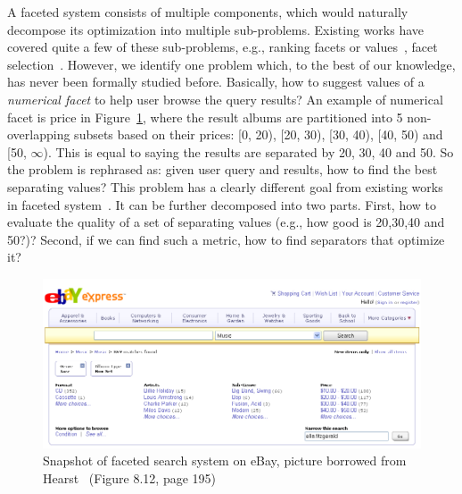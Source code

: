 A faceted system consists of multiple components, which would naturally decompose its optimization into multiple sub-problems. Existing works have covered quite a few of these sub-problems, e.g., ranking facets or values~\cite{Zwol,journals/ijon/KangYZTHC15,kashyap10}, facet selection~\cite{Liberman:2012:AOF:2245276.2245409,Roy08}. However, we identify one problem which, to the best of our knowledge, has never been formally studied before. Basically, how to suggest values of a \emph{numerical facet} to help user browse the query results? An example of numerical facet is price in Figure~\ref{fig:intro_example}, where the result albums are partitioned into 5 non-overlapping subsets based on their prices: [0, 20), [20, 30), [30, 40), [40, 50) and [50, $\infty$). This is equal to saying the results are separated by 20, 30, 40 and 50. So the problem is rephrased as: given user query and results, how to find the best separating values? This problem has a clearly different goal from existing works in faceted system~\cite{Roy08,Liberman:2012:AOF:2245276.2245409,kashyap10,Koren:2008:PIF:1367497.1367562,Hearst2008UI,Vandic:2013:FSA:2505515.2505664}. It can be further decomposed into two parts. First, how to evaluate the quality of a set of separating values (e.g., how good is 20,30,40 and 50?)? Second, if we can find such a metric, how to find separators that optimize it? 

\begin{figure}
\centering
\includegraphics[scale=0.25]{./figure/chapter3//eBay_meitu_1.jpg}
\caption[Caption for LOF]{Snapshot of faceted search system on eBay, picture borrowed from Hearst~\cite{hearst2009search} (Figure 8.12, page 195)\label{fig:intro_example}}
\vspace{-0.2in}
\end{figure}

